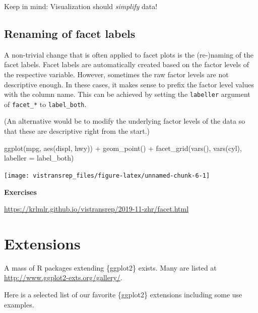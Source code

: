 \documentclass[]{book}
\newenvironment{Shaded}{}{}
\newcommand{\DataTypeTok}[1]{#1}
\newcommand{\KeywordTok}[1]{\textcolor[rgb]{0.00,0.00,1.00}{#1}}
\newcommand{\NormalTok}[1]{#1}
\newcommand{\OperatorTok}[1]{#1}
\newcommand{\StringTok}[1]{\textcolor[rgb]{0.00,0.50,0.50}{#1}}
\begin{document}
Keep in mind: Visualization should \emph{simplify} data!

\hypertarget{renaming-of-facet-labels}{%
\subsection{Renaming of facet labels}\label{renaming-of-facet-labels}}

A non-trivial change that is often applied to facet plots is the (re-)naming of the facet labels.
Facet labels are automatically created based on the factor levels of the respective variable.
However, sometimes the raw factor levels are not descriptive enough.
In these cases, it makes sense to prefix the factor level values with the column name.
This can be achieved by setting the \texttt{labeller} argument of \texttt{facet\_*} to \texttt{label\_both}.

(An alternative would be to modify the underlying factor levels of the data so that these are descriptive right from the start.)

\begin{Shaded}
\begin{Highlighting}[]
\KeywordTok{ggplot}\NormalTok{(mpg, }\KeywordTok{aes}\NormalTok{(displ, hwy)) }\OperatorTok{+}
\StringTok{  }\KeywordTok{geom_point}\NormalTok{() }\OperatorTok{+}
\StringTok{  }\KeywordTok{facet_grid}\NormalTok{(}\KeywordTok{vars}\NormalTok{(), }\KeywordTok{vars}\NormalTok{(cyl), }\DataTypeTok{labeller =}\NormalTok{ label_both)}
\end{Highlighting}
\end{Shaded}

\begin{flushright}\texttt{[image: vistransrep\_files/figure-latex/unnamed-chunk-6-1]} \end{flushright}

\textbf{Exercises}

\url{https://krlmlr.github.io/vistransrep/2019-11-zhr/facet.html}

\hypertarget{extensions}{%
\section{Extensions}\label{extensions}}

A mass of R packages extending \{ggplot2\} exists.
Many are listed at \url{http://www.ggplot2-exts.org/gallery/}.

Here is a selected list of our favorite \{ggplot2\} extensions including some use examples.
\end{document}
